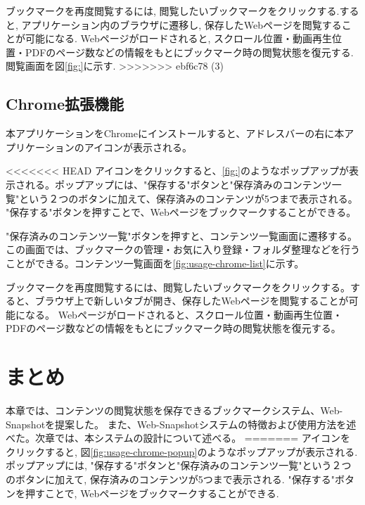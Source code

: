 ブックマークを再度閲覧するには, 閲覧したいブックマークをクリックする.すると, アプリケーション内のブラウザに遷移し, 保存したWebページを閲覧することが可能になる.
Webページがロードされると, スクロール位置・動画再生位置・PDFのページ数などの情報をもとにブックマーク時の閲覧状態を復元する.
閲覧画面を図\ref{fig:}に示す.
>>>>>>> ebf6c78 (3)

\subsection{Chrome拡張機能}
本アプリケーションをChromeにインストールすると、アドレスバーの右に本アプリケーションのアイコンが表示される。

<<<<<<< HEAD
アイコンをクリックすると、\ref{fig:}のようなポップアップが表示される。ポップアップには、"保存する"ボタンと"保存済みのコンテンツ一覧"という２つのボタンに加えて、保存済みのコンテンツが5つまで表示される。
"保存する"ボタンを押すことで、Webページをブックマークすることができる。

"保存済みのコンテンツ一覧"ボタンを押すと、コンテンツ一覧画面に遷移する。
この画面では、ブックマークの管理・お気に入り登録・フォルダ整理などを行うことができる。コンテンツ一覧画面を\ref{fig:usage-chrome-list}に示す。

ブックマークを再度閲覧するには、閲覧したいブックマークをクリックする。すると、ブラウザ上で新しいタブが開き、保存したWebページを閲覧することが可能になる。
Webページがロードされると、スクロール位置・動画再生位置・PDFのページ数などの情報をもとにブックマーク時の閲覧状態を復元する。

\section{まとめ}
本章では、コンテンツの閲覧状態を保存できるブックマークシステム、Web-Snapshotを提案した。
また、Web-Snapshotシステムの特徴および使用方法を述べた。次章では、本システムの設計について述べる。
=======
アイコンをクリックすると, 図\ref{fig:usage-chrome-popup}のようなポップアップが表示される.ポップアップには, "保存する"ボタンと"保存済みのコンテンツ一覧"という２つのボタンに加えて, 保存済みのコンテンツが5つまで表示される.
"保存する"ボタンを押すことで, Webページをブックマークすることができる.

